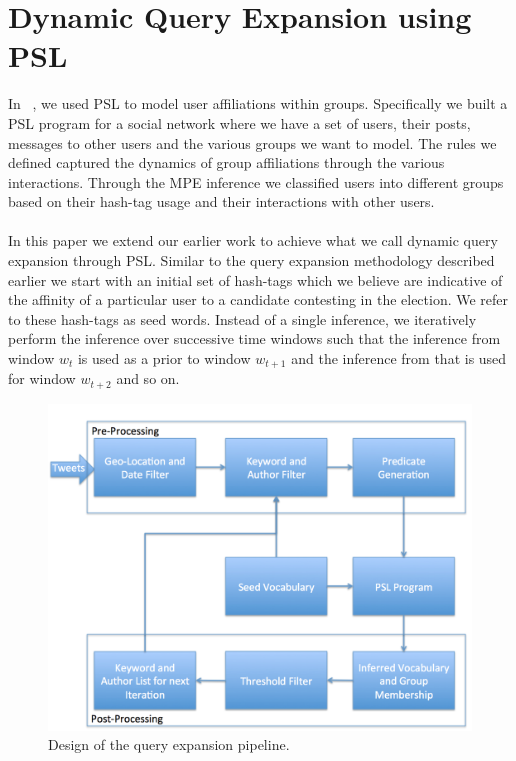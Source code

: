 \section{Dynamic Query Expansion using PSL}
In ~\cite{huang2012social}, we used PSL to model user affiliations within groups. 
Specifically we built a PSL program for a  social network where we have a set of users, their posts, messages to other users and the various groups we want to model. 
The rules we defined captured the dynamics of group affiliations through the various interactions.
Through the MPE inference we classified users into different groups based on their hash-tag usage and their interactions with other users.
\paragraph{}
In this paper we extend our earlier work to achieve what we call dynamic query expansion through PSL. 
Similar to the query expansion methodology described earlier we start with an initial set of hash-tags which we believe are indicative of the affinity of a particular user to a candidate contesting in the election.
We refer to these hash-tags as seed words.
Instead of a single inference, we iteratively perform the inference over successive time windows such that the inference from window $w_t$ is used as a prior to window $w_{t+1}$ and the inference from that is used for window $w_{t+2}$ and so on.
\begin{figure}[Ht]
	\centering
	\includegraphics[height=0.5\textheight, width=1.0\textwidth]{support_files/flowChart.png}
	\caption{Design of the query expansion pipeline.}
	\label{fig:flowchart}
\end{figure}
